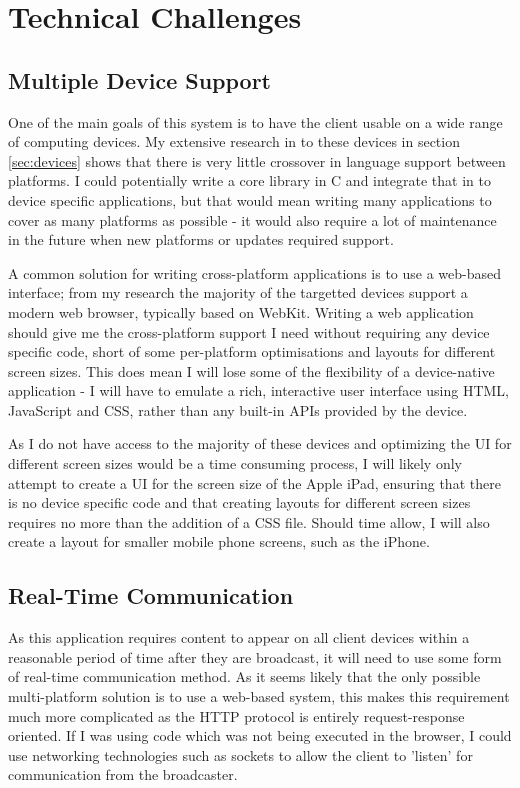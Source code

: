 \documentclass[a4papert,11pt,notitlepage]{ltxdoc}
\begin{document}
\section{Technical Challenges}
\subsection{Multiple Device Support}
One of the main goals of this system is to have the client usable on a wide range of computing devices. My extensive research in to these devices in section \ref{sec:devices} shows that there is very little crossover in language support between platforms. I could potentially write a core library in C and integrate that in to device specific applications, but that would mean writing many applications to cover as many platforms as possible - it would also require a lot of maintenance in the future when new platforms or updates required support.

A common solution for writing cross-platform applications is to use a web-based interface; from my research the majority of the targetted devices support a modern web browser, typically based on WebKit. Writing a web application should give me the cross-platform support I need without requiring any device specific code, short of some per-platform optimisations and layouts for different screen sizes. This does mean I will lose some of the flexibility of a device-native application - I will have to emulate a rich, interactive user interface using HTML, JavaScript and CSS, rather than any built-in APIs provided by the device.

As I do not have access to the majority of these devices and optimizing the UI for different screen sizes would be a time consuming process, I will likely only attempt to create a UI for the screen size of the Apple iPad, ensuring that there is no device specific code and that creating layouts for different screen sizes requires no more than the addition of a CSS file. Should time allow, I will also create a layout for smaller mobile phone screens, such as the iPhone.

\subsection{Real-Time Communication}
As this application requires content to appear on all client devices within a reasonable period of time after they are broadcast, it will need to use some form of real-time communication method. As it seems likely that the only possible multi-platform solution is to use a web-based system, this makes this requirement much more complicated as the HTTP protocol is entirely request-response oriented. If I was using code which was not being executed in the browser, I could use networking technologies such as sockets to allow the client to 'listen' for communication from the broadcaster.
\end{document}

